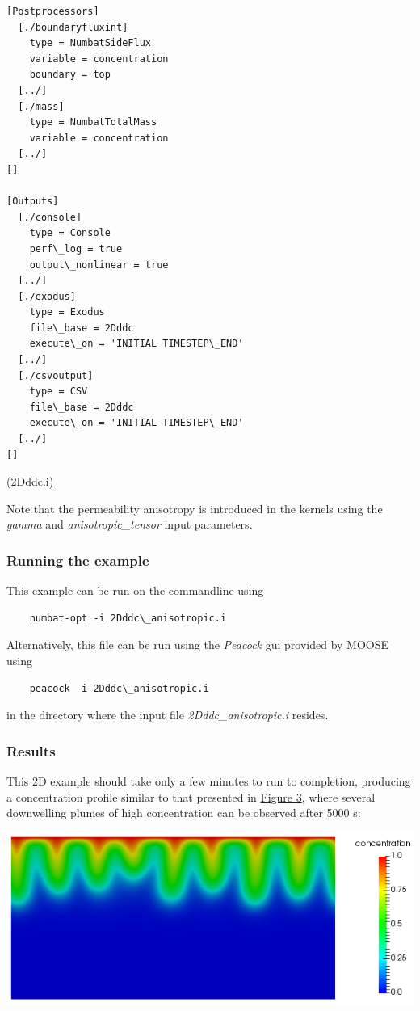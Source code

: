 \documentclass[12pt]{article}
\begin{document}
\begin{lstlisting}
[Postprocessors]
  [./boundaryfluxint]
    type = NumbatSideFlux
    variable = concentration
    boundary = top
  [../]
  [./mass]
    type = NumbatTotalMass
    variable = concentration
  [../]
[]

[Outputs]
  [./console]
    type = Console
    perf\_log = true
    output\_nonlinear = true
  [../]
  [./exodus]
    type = Exodus
    file\_base = 2Dddc
    execute\_on = 'INITIAL TIMESTEP\_END'
  [../]
  [./csvoutput]
    type = CSV
    file\_base = 2Dddc
    execute\_on = 'INITIAL TIMESTEP\_END'
  [../]
[]
\end{lstlisting}\href{https://github.com/idaholab/moose/blob/master/examples/2D/anisotropic/2Dddc.i}{(2Dddc.i)}
\par
Note that the permeability anisotropy is introduced in the kernels using the \emph{gamma} and \emph{anisotropic\_tensor} input parameters.\subsubsection{Running the example\label{running-the-example\_1}}
\par
This example can be run on the commandline using\begin{lstlisting}
    numbat-opt -i 2Dddc\_anisotropic.i
\end{lstlisting}
\par
Alternatively, this file can be run using the \emph{Peacock} gui provided by
MOOSE using\begin{lstlisting}
    peacock -i 2Dddc\_anisotropic.i
\end{lstlisting}
\par
in the directory where the input file \emph{2Dddc\_anisotropic.i} resides.\subsubsection{Results\label{results\_1}}
\par
This 2D example should take only a few minutes to run to completion,
producing a concentration profile similar to that presented in \href{#Figure}{Figure 3},
where several downwelling plumes of high concentration can be observed after 5000 s:
\par
\includegraphics[width=\linewidth]{media/2Danisotropic.png}
\end{document}
